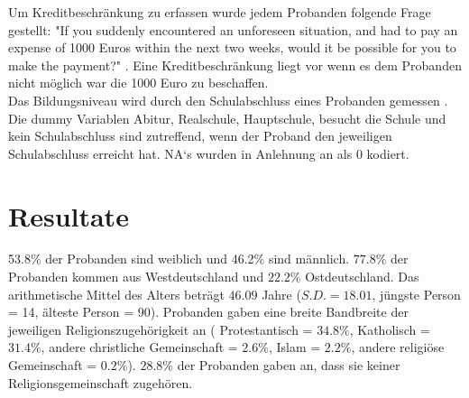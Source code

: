 \documentclass[11pt,a4paper]{article}
\begin{document}
Um Kreditbeschränkung zu erfassen wurde jedem Probanden folgende Frage gestellt: "If you suddenly encountered an unforeseen situation, and had to pay an expense of 1000 Euros within the next two weeks, would it be possible for you to make the payment?" \parencite{dohmen2012interpreting}. Eine Kreditbeschränkung liegt vor wenn es dem Probanden nicht möglich war die 1000 Euro zu beschaffen. \\ 

Das Bildungsniveau wird durch den Schulabschluss eines Probanden gemessen \parencite{dohmen2010risk}. Die dummy Variablen Abitur, Realschule, Hauptschule, besucht die Schule und kein Schulabschluss sind zutreffend, wenn der Proband den jeweiligen Schulabschluss erreicht hat. NA`s wurden in Anlehnung an \textcite{dohmen2010risk} als 0 kodiert.\\









  


\section{Resultate}
53.8\% der Probanden sind weiblich und 46.2\% sind männlich.  $77.8\%$ der Probanden kommen aus Westdeutschland und $22.2\%$ Ostdeutschland. Das arithmetische Mittel des Alters beträgt $46.09$ Jahre ($S.D. = 18.01$,  jüngste Person = 14, älteste Person = 90). Probanden gaben eine breite Bandbreite der jeweiligen Religionszugehörigkeit an ( Protestantisch = $34.8\%$, Katholisch = $31.4\%$, andere christliche Gemeinschaft = $2.6\%$, Islam = $2.2\%$, andere religiöse Gemeinschaft = $0.2\%$). $28.8\%$ der Probanden gaben an, dass sie keiner Religionsgemeinschaft zugehören.
\end{document}
